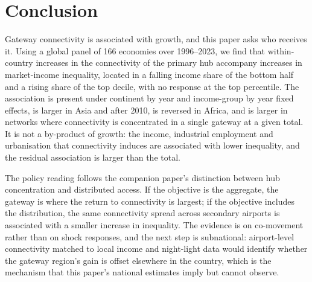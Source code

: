 \documentclass[12pt]{article}
\begin{document}
\section{Conclusion}
\label{sec:conclusion}
Gateway connectivity is associated with growth, and this paper asks who receives it. Using a global panel of 166 economies over 1996--2023, we find that within-country increases in the connectivity of the primary hub accompany increases in market-income inequality, located in a falling income share of the bottom half and a rising share of the top decile, with no response at the top percentile. The association is present under continent by year and income-group by year fixed effects, is larger in Asia and after 2010, is reversed in Africa, and is larger in networks where connectivity is concentrated in a single gateway at a given total. It is not a by-product of growth: the income, industrial employment and urbanisation that connectivity induces are associated with lower inequality, and the residual association is larger than the total.

The policy reading follows the companion paper's distinction between hub concentration and distributed access. If the objective is the aggregate, the gateway is where the return to connectivity is largest; if the objective includes the distribution, the same connectivity spread across secondary airports is associated with a smaller increase in inequality. The evidence is on co-movement rather than on shock responses, and the next step is subnational: airport-level connectivity matched to local income and night-light data would identify whether the gateway region's gain is offset elsewhere in the country, which is the mechanism that this paper's national estimates imply but cannot observe.



\end{document}
